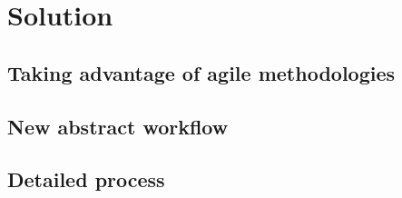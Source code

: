 \section{Solution}\label{sec:solution}




\subsection{Taking advantage of agile methodologies}\label{subsec:taking-advantage-of-agile-methodologies}

\subsection{New abstract workflow}\label{subsec:new-abstract-workflow}

\subsection{Detailed process}\label{subsec:detailed-process}